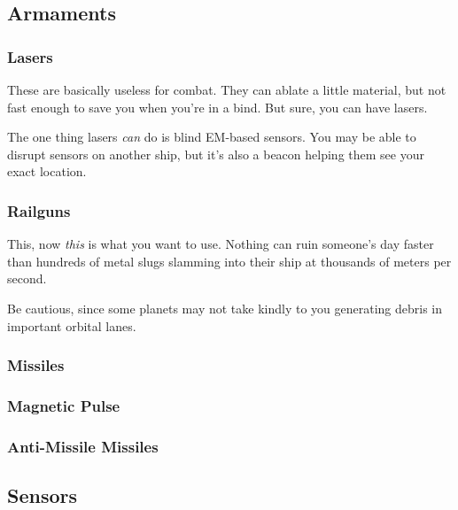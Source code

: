 \subsection{Armaments}

\subsubsection{Lasers}
\par
These are basically useless for combat. They can ablate a little material, but not fast enough to save you when you're in a bind. But sure, you can have lasers.

\par
The one thing lasers \textit{can} do is blind EM-based sensors. You may be able to disrupt sensors on another ship, but it's also a beacon helping them see your exact location.


\subsubsection{Railguns}
\par
This, now \textit{this} is what you want to use. Nothing can ruin someone's day faster than hundreds of metal slugs slamming into their ship at thousands of meters per second.

\par
Be cautious, since some planets may not take kindly to you generating debris in important orbital lanes.


\subsubsection{Missiles}


\subsubsection{Magnetic Pulse}


\subsubsection{Anti-Missile Missiles}

\subsection{Sensors}

